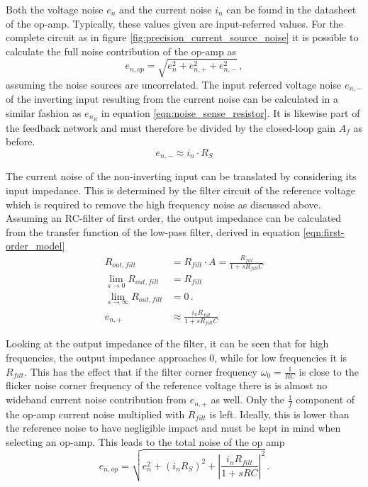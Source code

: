Both the voltage noise $e_n$ and the current noise $i_n$ can be found in the datasheet of the op-amp. Typically, these values given are input-referred values. For the complete circuit as in figure \ref{fig:precision_current_source_noise} it is possible to calculate the full noise contribution of the op-amp as
\begin{equation}
    e_{n,op} = \sqrt{e_n^2 + e_{n,+}^2 + e_{n,-}^2}\,,
\end{equation}
assuming the noise sources are uncorrelated. The input referred voltage noise $e_{n,-}$ of the inverting input resulting from the current noise can be calculated in a similar fashion as $e_{n_R}$ in equation \ref{eqn:noise_sense_resistor}. It is likewise part of the feedback network and must therefore be divided by the closed-loop gain $A_f$ as before.
\begin{equation}
    e_{n,-} \approx i_n \cdot R_S
\end{equation}

The current noise of the non-inverting input can be translated by considering its input impedance. This is determined by the filter circuit of the reference voltage which is required to remove the high frequency noise as discussed above. Assuming an RC-filter of first order,
the output impedance can be calculated from the transfer function of the low-pass filter, derived in equation \ref{eqn:first-order_model}
\begin{align}
    R_{out,filt} &= R_{filt} \cdot A = \frac{R_{filt}}{1+sR_{filt}C}  \label{eqn:output_impedance_rc_filter}\\
    \lim_{s \to 0} R_{out,filt} &= R_{filt} \nonumber\\
    \lim_{s \to \infty} R_{out,filt} &= 0 \,.\nonumber\\
     e_{n,+} &\approx \frac{i_n R_{filt}}{1+sR_{filt}C}
\end{align}

Looking at the output impedance of the filter, it can be seen that for high frequencies, the output impedance approaches \num{0}, while for low frequencies it is $R_{filt}$. This has the effect that if the filter corner frequency $\omega_0 = \frac{1}{RC}$ is close to the flicker noise corner frequency of the reference voltage there is is almost no wideband current noise contribution from $e_{n,+}$ as well. Only the $\frac{1}{f}$ component of the op-amp current noise multiplied with $R_{filt}$ is left. Ideally, this is lower than the reference noise to have negligible impact and must be kept in mind when selecting an op-amp.
This leads to the total noise of the op amp
\begin{equation}
    e_{n,op} = \sqrt{e_n^2 + (i_n R_S)^2 + \left|\frac{i_n R_{filt}}{1+sRC}\right|^2} \,.
\end{equation}

